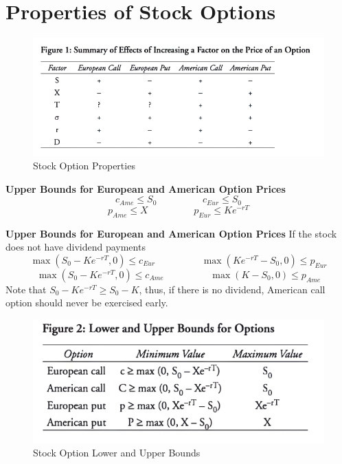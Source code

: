 \documentclass[11pt,fleqn]{report} %
\numberwithin{equation}{section} %
\numberwithin{figure}{section} %
\numberwithin{table}{section} %
\begin{document}
\chapter{Properties of Stock Options}
 \begin{center}
     \begin{figure}[h!]
         \centering
         \includegraphics[scale=0.7]{stockprop.PNG}
         \caption{Stock Option Properties}
     \end{figure}
 \end{center}
 \begin{theorem}\textbf{Upper Bounds for European and American Option Prices}
 $$
 c_{Ame}\leq S_0\hspace{2cm}c_{Eur}\leq S_0
 $$
 $$
 p_{Ame}\leq X\hspace{2cm}p_{Eur}\leq Ke^{-rT}
 $$
 \end{theorem}
 \begin{theorem}\textbf{Upper Bounds for European and American Option Prices}
 If the stock does not have dividend payments
 $$
 \max(S_0-Ke^{-rT},0)\leq c_{Eur}\hspace{2cm}\max(Ke^{-rT}-S_0,0)\leq p_{Eur}
 $$
 $$
 \max(S_0-Ke^{-rT},0)\leq c_{Ame}\hspace{2cm}\max(K-S_0,0)\leq p_{Ame}
 $$
 Note that $S_0-Ke^{-rT}\geq S_0-K$, thus, if there is no dividend, American call option should never be exercised early.
 \end{theorem}
 \begin{center}
     \begin{figure}[h!]
         \centering
         \includegraphics[scale=0.8]{uloption.PNG}
         \caption{Stock Option Lower and Upper Bounds}
     \end{figure}
 \end{center}
\end{document}
